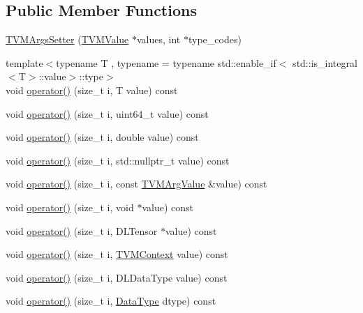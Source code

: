 \subsection*{Public Member Functions}
\begin{DoxyCompactItemize}
\item 
\hyperlink{classtvm_1_1runtime_1_1TVMArgsSetter_a5882f7eda112e825eb5a87e45aeb85b0}{T\+V\+M\+Args\+Setter} (\hyperlink{unionTVMValue}{T\+V\+M\+Value} $\ast$values, int $\ast$type\+\_\+codes)
\item 
{\footnotesize template$<$typename T , typename  = typename std\+::enable\+\_\+if$<$             std\+::is\+\_\+integral$<$\+T$>$\+::value$>$\+::type$>$ }\\void \hyperlink{classtvm_1_1runtime_1_1TVMArgsSetter_a3c657d4b0f50577949521abe324c5325}{operator()} (size\+\_\+t i, T value) const 
\item 
void \hyperlink{classtvm_1_1runtime_1_1TVMArgsSetter_a7f24de1646e5a56b405e3e95ca71dcd1}{operator()} (size\+\_\+t i, uint64\+\_\+t value) const 
\item 
void \hyperlink{classtvm_1_1runtime_1_1TVMArgsSetter_a410f230315a467a6c6543d24d8cccce6}{operator()} (size\+\_\+t i, double value) const 
\item 
void \hyperlink{classtvm_1_1runtime_1_1TVMArgsSetter_a020a38f10ece8241e07c7bbc08b8d6b8}{operator()} (size\+\_\+t i, std\+::nullptr\+\_\+t value) const 
\item 
void \hyperlink{classtvm_1_1runtime_1_1TVMArgsSetter_a25374dbab9fea2a0c482201d0e37451e}{operator()} (size\+\_\+t i, const \hyperlink{classtvm_1_1runtime_1_1TVMArgValue}{T\+V\+M\+Arg\+Value} \&value) const 
\item 
void \hyperlink{classtvm_1_1runtime_1_1TVMArgsSetter_a1869ead078ccedb854a4ef245c4c0b2c}{operator()} (size\+\_\+t i, void $\ast$value) const 
\item 
void \hyperlink{classtvm_1_1runtime_1_1TVMArgsSetter_a69ffbd692883aa9ded039479d8504638}{operator()} (size\+\_\+t i, D\+L\+Tensor $\ast$value) const 
\item 
void \hyperlink{classtvm_1_1runtime_1_1TVMArgsSetter_aba4ec0ffadb2adc12cc5107cfab6374b}{operator()} (size\+\_\+t i, \hyperlink{c__runtime__api_8h_a9363bb701f16ce5bbb381f2a013d25b4}{T\+V\+M\+Context} value) const 
\item 
void \hyperlink{classtvm_1_1runtime_1_1TVMArgsSetter_a16925c8479ab919bcd179692b4f14a24}{operator()} (size\+\_\+t i, D\+L\+Data\+Type value) const 
\item 
void \hyperlink{classtvm_1_1runtime_1_1TVMArgsSetter_a24a691e6243daeb46554eb692e5242ac}{operator()} (size\+\_\+t i, \hyperlink{classtvm_1_1runtime_1_1DataType}{Data\+Type} dtype) const 

\end{DoxyCompactItemize}
